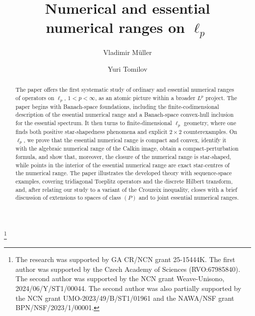 \documentclass[11pt]{amsart}
\numberwithin{equation}{section}
\theoremstyle{definition}
\theoremstyle{remark}
\begin{document}
\title[Numerical and essential numerical ranges on $\ell_p$]
{Numerical and essential \\numerical ranges on $\ell_p$}
\author[V. M\"uller]{Vladimir M\"uller}
\address{Institute of Mathematics, Czech Academy of Sciences, \v{Z}itn\'a 25, 115 67 Prague, Czech Republic}

\author[Y. Tomilov]{Yuri Tomilov}
\address{Institute of Mathematics, Polish Academy of Sciences, \'Sniadeckich 8, 00-656 Warsaw, Poland}
\address{Faculty of Mathematics and Computer Science, Nicolaus Copernicus University, Chopina 12/18, 87-100 Toru\'n, Poland}

\thanks{The research was supported by GA CR/NCN grant 25-15444K. The first author was supported by the Czech Academy of Sciences (RVO:67985840). The second author was supported by the NCN grant Weave-Unisono, 2024/06/Y/ST1/00044. The second author was also partially supported by the NCN grant UMO-2023/49/B/ST1/01961 and the NAWA/NSF grant BPN/NSF/2023/1/00001.}
\date{}
\begin{abstract}
The paper offers the first systematic study of ordinary and essential numerical ranges of operators on $\ell_p$, $1<p<\infty$, as an atomic picture within a broader $L^p$ project. The paper begins with Banach-space foundations, including the finite-codimensional description of the essential numerical range and a Banach-space convex-hull inclusion for the essential spectrum. It then turns to finite-dimensional $\ell_p$ geometry, where one finds both positive star-shapedness phenomena and explicit $2\times2$ counterexamples. On $\ell_p$, we prove that the essential numerical range is compact and convex, identify it with the algebraic numerical range of the Calkin image, obtain a compact-perturbation formula, and show that, moreover, the closure of the numerical range is star-shaped, while points in the interior of the essential numerical range are exact star-centres of the numerical range.
The paper illustrates the developed theory with sequence-space examples, covering tridiagonal Toeplitz operators and the discrete Hilbert transform, and, after relating our study to a variant of the Crouzeix inequality, closes with a brief discussion of extensions to spaces of class $(P)$ and to joint essential numerical ranges.
\end{abstract}

\maketitle
\end{document}
